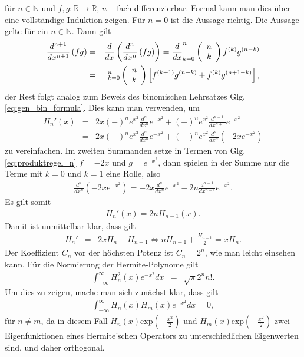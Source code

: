 \documentclass{book}
\renewcommand{\exp}{\text{exp}}
\let\sum\relax
\DeclareMathOperator*{\sum}{\raisebox{-3.5pt}{\scalebox{2}{\rotatebox{1}{{\bask Σ}}}}}
\begin{document}
%
für $n\in\mathbb{N}$ und $f, g:\mathbb{R}\to\mathbb{R}$, $n-$fach differenzierbar. Formal kann man dies über eine vollständige Induktion zeigen. Für $n = 0$ ist die Aussage richtig. Die Aussage gelte für ein $n\in\mathbb{N}$. Dann gilt
%
\begin{eqnarray}
\frac{d^{n + 1}}{dx^{n + 1}}\left(fg\right) & = & \frac{d}{dx}\left(\frac{d^n}{dx^n}\left(fg\right)\right) = \frac{d}{dx}\sum_{k = 0}^{n}\left(\begin{array}{c}
n\\
k
\end{array}\right)f^{(k)}g^{(n - k)}\nonumber\\
& = & \sum_{k = 0}^{n}\left(\begin{array}{c}
n\\
k
\end{array}\right)\left[f^{(k + 1)}g^{(n - k)} + f^{(k)}g^{(n + 1 - k)}\right], 
\end{eqnarray}
%
der Rest folgt analog zum Beweis des binomischen Lehrsatzes Glg. \eqref{eq:gen_bin_formula}. Dies kann man verwenden, um
%
\begin{eqnarray}
H_n'\left(x\right) & = & 2x\left(-\right)^ne^{x^2}\frac{d^n}{dx^n}e^{-x^2} + \left(-\right)^ne^{x^2}\frac{d^{n + 1}}{dx^{n + 1}}e^{-x^2}\nonumber\\
& = & 2x\left(-\right)^ne^{x^2}\frac{d^n}{dx^n}e^{-x^2} + \left(-\right)^ne^{x^2}\frac{d^n}{dx^n}\left(-2xe^{-x^2}\right)
\end{eqnarray}
%
zu vereinfachen. Im zweiten Summanden setze in Termen von Glg. \eqref{eq:produktregel_n} $f = -2x$ und $g = e^{-x^2}$, dann spielen in der Summe nur die Terme mit $k = 0$ und $k = 1$ eine Rolle, also
%
\begin{eqnarray}
\frac{d^n}{dx^n}\left(-2xe^{-x^2}\right) = -2x\frac{d^n}{dx^n}e^{-x^2} - 2n\frac{d^{n - 1}}{dx^{n - 1}}e^{-x^2}.
\end{eqnarray}
%
Es gilt somit
%
\begin{eqnarray}
H_n'\left(x\right) = 2nH_{n - 1}\left(x\right).\label{eq:herm_pol_prop_1}
\end{eqnarray}
%
Damit ist unmittelbar klar, dass gilt
%
\begin{eqnarray}
H_n' & = & 2xH_n - H_{n + 1}\Leftrightarrow nH_{n - 1} + \frac{H_{n + 1}}{2} = xH_n.\label{eq:herm_pol_prop_2}
\end{eqnarray}
%
Der Koeffizient $C_n$ vor der höchsten Potenz ist $C_n = 2^n$, wie man leicht einsehen kann. Für die Normierung der Hermite-Polynome gilt
%
\begin{eqnarray}
\int_{ - \infty}^{\infty}H_n^2\left(x\right)e^{-x^2}dx & = & \sqrt{\pi}2^nn!.\label{eq:hermite_polynome_normierung}
\end{eqnarray}
%
Um dies zu zeigen, mache man sich zunächst klar, dass gilt
%
\begin{eqnarray}
\int_{ - \infty}^{\infty}H_n\left(x\right)H_m\left(x\right)e^{-x^2}dx = 0, 
\end{eqnarray}
%
für $n\not = m$, da in diesem Fall $H_n\left(x\right)\exp\left(-\frac{x^2}{2}\right)$ und $H_m\left(x\right)\exp\left(-\frac{x^2}{2}\right)$ zwei Eigenfunktionen eines Hermite'schen Operators zu unterschiedlichen Eigenwerten sind, und daher orthogonal.
\end{document}

